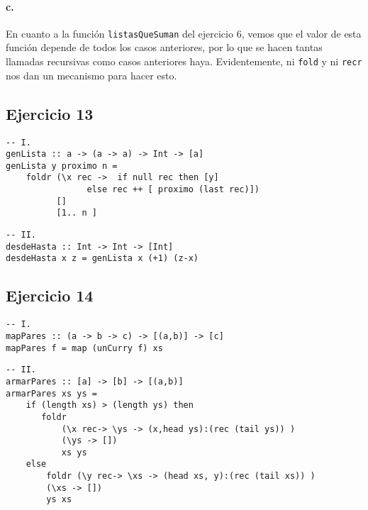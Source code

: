 \documentclass[10pt,a4paper]{article}
\begin{document}
\paragraph{c.} En cuanto a la función \texttt{listasQueSuman} del ejercicio 6, vemos que el valor de esta función depende de todos los casos anteriores, por lo que se hacen tantas llamadas recursivas como casos anteriores haya. Evidentemente, ni \texttt{fold} y ni \texttt{recr} nos dan un mecanismo para hacer esto.

\subsection{Ejercicio 13}
\begin{centrado}
	\begin{verbatim}
-- I.
genLista :: a -> (a -> a) -> Int -> [a]
genLista y proximo n = 
    foldr (\x rec ->  if null rec then [y]
	            else rec ++ [ proximo (last rec)])
          []
          [1.. n ]
	\end{verbatim}
\end{centrado}

\begin{centrado}
	\begin{verbatim}
-- II.
desdeHasta :: Int -> Int -> [Int]
desdeHasta x z = genLista x (+1) (z-x)
	\end{verbatim}
\end{centrado}

\subsection{Ejercicio 14}
\begin{centrado}
\begin{verbatim}
-- I.
mapPares :: (a -> b -> c) -> [(a,b)] -> [c]
mapPares f = map (unCurry f) xs
\end{verbatim}
\end{centrado}
\begin{centrado}
	\begin{verbatim}
-- II.
armarPares :: [a] -> [b] -> [(a,b)]
armarPares xs ys =
    if (length xs) > (length ys) then 
       foldr 
	       (\x rec-> \ys -> (x,head ys):(rec (tail ys)) )
           (\ys -> [])
           xs ys
    else 
		foldr (\y rec-> \xs -> (head xs, y):(rec (tail xs)) )
        (\xs -> [])
        ys xs
	\end{verbatim}
\end{centrado}
\end{document}

